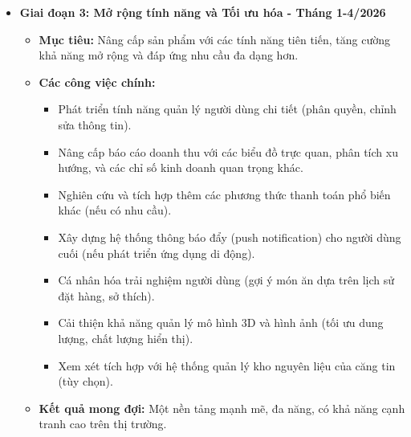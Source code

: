 \documentclass[12pt,a4paper]{article}
\begin{document}
\begin{itemize}[label=\textbullet]
    \item \textbf{Giai đoạn 3: Mở rộng tính năng và Tối ưu hóa - Tháng 1-4/2026}
    \begin{itemize}[label=\textendash]
        \item \textbf{Mục tiêu:} Nâng cấp sản phẩm với các tính năng tiên tiến, tăng cường khả năng mở rộng và đáp ứng nhu cầu đa dạng hơn.
        \item \textbf{Các công việc chính:}
        \begin{itemize}[label=\textrightarrow]
            \item Phát triển tính năng quản lý người dùng chi tiết (phân quyền, chỉnh sửa thông tin).
            \item Nâng cấp báo cáo doanh thu với các biểu đồ trực quan, phân tích xu hướng, và các chỉ số kinh doanh quan trọng khác.
            \item Nghiên cứu và tích hợp thêm các phương thức thanh toán phổ biến khác (nếu có nhu cầu).
            \item Xây dựng hệ thống thông báo đẩy (push notification) cho người dùng cuối (nếu phát triển ứng dụng di động).
            \item Cá nhân hóa trải nghiệm người dùng (gợi ý món ăn dựa trên lịch sử đặt hàng, sở thích).
            \item Cải thiện khả năng quản lý mô hình 3D và hình ảnh (tối ưu dung lượng, chất lượng hiển thị).
            \item Xem xét tích hợp với hệ thống quản lý kho nguyên liệu của căng tin (tùy chọn).
        \end{itemize}
        \item \textbf{Kết quả mong đợi:} Một nền tảng mạnh mẽ, đa năng, có khả năng cạnh tranh cao trên thị trường.
    \end{itemize}


\end{itemize}
\end{document}
